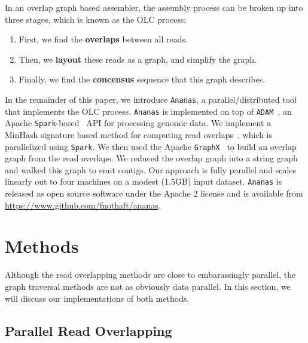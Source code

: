 \documentclass[11pt]{article}
\theoremstyle{plain}
\begin{document}
In an overlap graph based assembler, the assembly process can be broken up into three stages,
which is known as the OLC process:

\begin{enumerate}
\item First, we find the \textbf{overlaps} between all reads.
\item Then, we \textbf{layout} these reads as a graph, and simplify the graph.
\item Finally, we find the \textbf{concensus} sequence that this graph describes.
\end{enumerate}

In the remainder of this paper, we introduce \texttt{Ananas}, a parallel/distributed tool that
implements the OLC process. \texttt{Ananas} is implemented on top of \texttt{ADAM}~\cite{massie13,
nothaft15}, an Apache \texttt{Spark}-based~\cite{zaharia12, zaharia10} API for processing genomic
data. We implement a MinHash signature based method for computing read overlaps~\cite{berlin14},
which is parallelized using \texttt{Spark}. We then used the Apache \texttt{GraphX}~\cite{gonzalez14,
xin13} to build an overlap graph from the read overlaps. We reduced the overlap graph into a
string graph~\cite{myers05} and walked this graph to emit contigs. Our approach is fully parallel
and scales linearly out to four machines on a modest (1.5GB) input dataset. \texttt{Ananas} is
released as open source software under the Apache 2 license and is available from
\url{https://www.github.com/fnothaft/ananas}.

\section{Methods}
\label{sec:methods}

Although the read overlapping methods are close to embarassingly parallel, the graph traversal
methods are not as obviously data parallel. In this section, we will discuss our implementations
of both methods.

\subsection{Parallel Read Overlapping}
\label{sec:overlapping}
\end{document}
